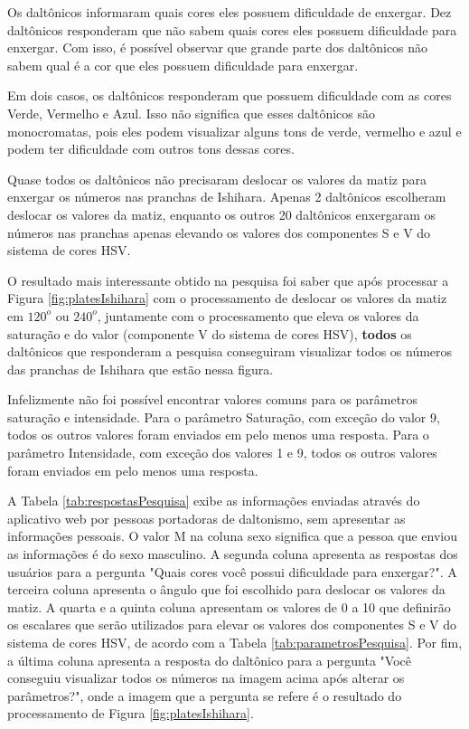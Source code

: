 \documentclass[	12pt, Times, openright, twoside, a4paper, english, brazil]{abntex2}
\begin{document}
Os daltônicos informaram quais cores eles possuem dificuldade de enxergar. Dez daltônicos responderam que não sabem quais cores eles possuem dificuldade para enxergar. Com isso, é possível observar que grande parte dos daltônicos não sabem qual é a cor que eles possuem dificuldade para enxergar.

Em dois casos, os daltônicos responderam que possuem dificuldade com as cores Verde, Vermelho e Azul. Isso não significa que esses daltônicos são monocromatas, pois eles podem visualizar alguns tons de verde, vermelho e azul e podem ter dificuldade com outros tons dessas cores. 

Quase todos os daltônicos não precisaram deslocar os valores da matiz para enxergar os números nas pranchas de Ishihara. Apenas 2 daltônicos escolheram deslocar os valores da matiz, enquanto os outros 20 daltônicos enxergaram os números nas pranchas apenas elevando os valores dos componentes S e V do sistema de cores HSV.

O resultado mais interessante obtido na pesquisa foi saber que após processar a Figura \ref{fig:platesIshihara} com o processamento de deslocar os valores da matiz em $120^o$ ou $240^o$, juntamente com o processamento que eleva os valores da saturação e do valor (componente V do sistema de cores HSV), \textbf{todos} os daltônicos que responderam a pesquisa conseguiram visualizar todos os números das pranchas de Ishihara que estão nessa figura.

Infelizmente não foi possível encontrar valores comuns para os parâmetros saturação e intensidade. Para o parâmetro Saturação, com exceção do valor 9, todos os outros valores foram enviados em pelo menos uma resposta. Para o parâmetro Intensidade, com exceção dos valores 1 e 9, todos os outros valores foram enviados em pelo menos uma resposta.

A Tabela \ref{tab:respostasPesquisa} exibe as informações enviadas através do aplicativo web por pessoas portadoras de daltonismo, sem apresentar as informações pessoais. O valor M na coluna sexo significa que a pessoa que enviou as informações é do sexo masculino. A segunda coluna apresenta as respostas dos usuários para a pergunta "Quais cores você possui dificuldade para enxergar?". A terceira coluna apresenta o ângulo que foi escolhido para deslocar os valores da matiz. A quarta e a quinta coluna apresentam os valores de 0 a 10 que definirão os escalares que serão utilizados para elevar os valores dos componentes S e V do sistema de cores HSV, de acordo com a Tabela \ref{tab:parametrosPesquisa}. Por fim, a última coluna apresenta a resposta do daltônico para a pergunta "Você conseguiu visualizar todos os números na imagem acima após alterar os parâmetros?", onde a imagem que a pergunta se refere é o resultado do processamento de Figura \ref{fig:platesIshihara}.
\end{document}
